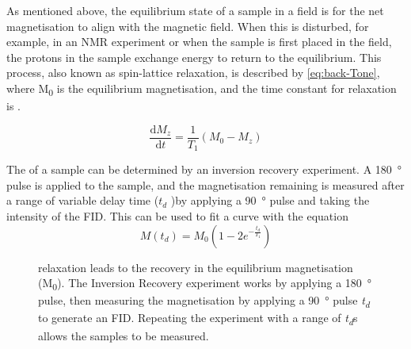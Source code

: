 As mentioned above, the equilibrium state of a sample in a \Bzero field is for the net magnetisation to align with the \Bzero magnetic field.
When this is disturbed, for example, in an NMR experiment or when the sample is first placed in the \Bzero field, the protons in the sample exchange energy to return to the equilibrium.
This process, also known as spin-lattice relaxation, is described by \autoref{eq:back-Tone}, where M\textsubscript{0} is the equilibrium magnetisation, and the time constant for relaxation is \Tone.

\begin{equation}
\frac{\mathrm{d} M_z}{\mathrm{d} t} = \frac{1}{T_1} (M_0-M_z)
\label{eq:back-Tone}
\end{equation}

The \Tone of a sample can be determined by an inversion recovery experiment.
A \SI{180}{\degree} pulse is applied to the sample, and the magnetisation remaining is measured after a range of variable delay time ($t_d$ )by applying a \SI{90}{\degree} pulse and taking the intensity of the FID.
This can be used to fit a curve with the equation
\begin{displaymath}
M(t_d) = M_0 (1 - 2 e^{-\frac{t_d}{T_1}})
\end{displaymath}

\begin{figure}[t]
\centering
{}
\caption[Inversion recovery experiment]{\Tone relaxation leads to the recovery in the equilibrium magnetisation (M\textsubscript{0}). The Inversion Recovery experiment works by applying a \SI{180}{\degree} pulse, then measuring the magnetisation by applying a \SI{90}{\degree} pulse \textit{t\textsubscript{d}} to generate an FID. Repeating the experiment with a range of \textit{t\textsubscript{d}}s allows the samples \Tone to be measured.}
\label{fig:back-T1}
\end{figure}

